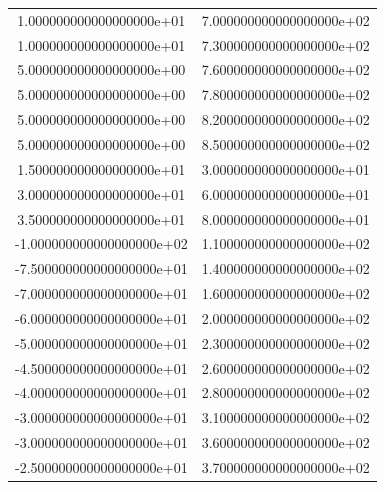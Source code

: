\begin{table}
\begin{tabular}{S S}
  1.000000000000000000e+01 & 7.000000000000000000e+02\\
  1.000000000000000000e+01 & 7.300000000000000000e+02\\
  5.000000000000000000e+00 & 7.600000000000000000e+02\\
  5.000000000000000000e+00 & 7.800000000000000000e+02\\
  5.000000000000000000e+00 & 8.200000000000000000e+02\\
  5.000000000000000000e+00 & 8.500000000000000000e+02\\
  1.500000000000000000e+01 & 3.000000000000000000e+01\\
  3.000000000000000000e+01 & 6.000000000000000000e+01\\
  3.500000000000000000e+01 & 8.000000000000000000e+01\\
  -1.000000000000000000e+02 & 1.100000000000000000e+02\\
  -7.500000000000000000e+01 & 1.400000000000000000e+02\\
  -7.000000000000000000e+01 & 1.600000000000000000e+02\\
  -6.000000000000000000e+01 & 2.000000000000000000e+02\\
  -5.000000000000000000e+01 & 2.300000000000000000e+02\\
  -4.500000000000000000e+01 & 2.600000000000000000e+02\\
  -4.000000000000000000e+01 & 2.800000000000000000e+02\\
  -3.000000000000000000e+01 & 3.100000000000000000e+02\\
  -3.000000000000000000e+01 & 3.600000000000000000e+02\\
  -2.500000000000000000e+01 & 3.700000000000000000e+02\\
  \bottomrule
\end{tabular}
\end{table}
